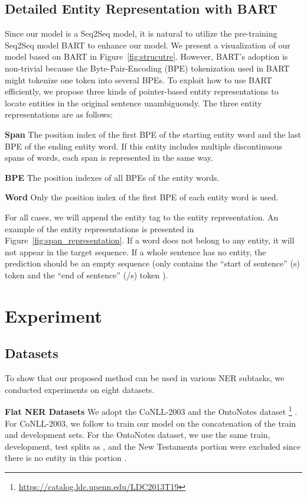 \documentclass[11pt,a4paper]{article}
\begin{document}
\subsection{Detailed Entity Representation with BART}
Since our model is a Seq2Seq model, it is natural to utilize the pre-training Seq2Seq model BART to enhance our model. We present a visualization of our model based on BART in Figure~\ref{fig:strucutre}. However, BART's adoption is non-trivial because the Byte-Pair-Encoding (BPE) tokenization used in BART might tokenize one token into several BPEs. To exploit how to use BART efficiently, we propose three kinds of pointer-based entity representations to locate entities in the original sentence unambiguously. The three entity representations are as follows:

\textbf{Span} The position index of the first BPE of the starting entity word and the last BPE of the ending entity word. If this entity includes multiple discontinuous spans of words, each span is represented in the same way.

\textbf{BPE} The position indexes of all BPEs of the entity words.

\textbf{Word} Only the position index of the first BPE of each entity word is used.

For all cases, we will append the entity tag to the entity representation. An example of the entity representations is presented in Figure~\ref{fig:span_representation}. If a word does not belong to any entity, it will not appear in the target sequence. If a whole sentence has no entity, the prediction should be an empty sequence (only contains the ``start of sentence'' (s) token and the ``end of sentence'' (/s) token ).



\section{Experiment}

\subsection{Datasets}
To show that our proposed method can be used in various NER subtasks, we conducted experiments on eight datasets.

\textbf{Flat NER Datasets} We adopt the CoNLL-2003 \citep{DBLP:conf/conll/SangM03} and the OntoNotes dataset \footnote{\url{https://catalog.ldc.upenn.edu/LDC2013T19}} \citep{DBLP:conf/conll/PradhanMXNBUZZ13}. For CoNLL-2003, we follow \citet{DBLP:conf/naacl/LampleBSKD16,DBLP:conf/acl/YuBP20} to train our model on the concatenation of the train and development sets. For the OntoNotes dataset, we use the same train, development, test splits as \citet{DBLP:conf/conll/PradhanMXUZ12,DBLP:conf/acl/YuBP20}, and the New Testaments portion were excluded since there is no entity in this portion \citep{DBLP:journals/tacl/ChiuN16}.
\end{document}
